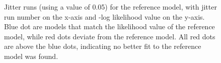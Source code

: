 \documentclass[
]{scrartcl}
\begin{document}
\begin{figure}[H]


\caption{\label{fig-jitter005}Jitter runs (using a value of 0.05) for
the reference model, with jitter run number on the x-axis and -log
likelihood value on the y-axis. Blue dot are models that match the
likelihood value of the reference model, while red dots deviate from the
reference model. All red dots are above the blue dots, indicating no
better fit to the reference model was found.}

\end{figure}%
\end{document}
